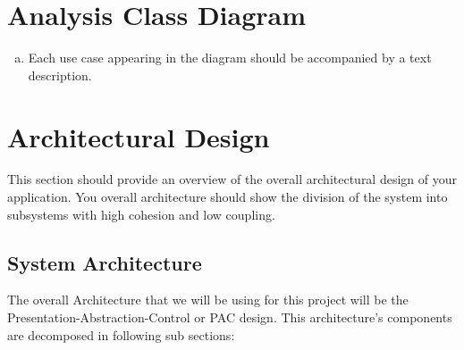 \documentclass[]{article}
\begin{document}
\section{Analysis Class Diagram}
\label{sec:analysis_class_diagram}
\begin{enumerate}[a)]
	\item Each use case appearing in the diagram should be accompanied by a text description. 
\end{enumerate}
\noindent{}

\section{Architectural Design}
\label{sec:architectural_design}
This section should provide an overview of the overall architectural design of
your application. You overall architecture should show the division of the system
into subsystems with high cohesion and low coupling.

\subsection{System Architecture}
\label{sub:system_architecture}

The overall Architecture that we will be using for this project will be the 
Presentation-Abstraction-Control or PAC design. This architecture’s components 
are decomposed in following sub sections: \\
\end{document}
